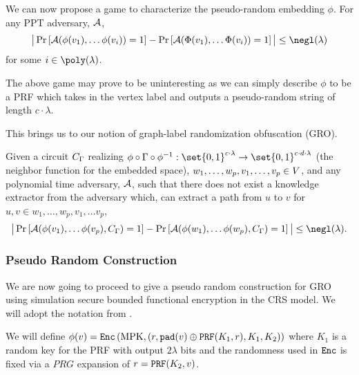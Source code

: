 We can now propose a game to characterize the pseudo-random embedding $\phi$.
For any PPT adversary, $\mathcal{A}$,
\begin{equation}
	\big|
		\Pr\left[\advers(\phi(v_1), \dots \phi(v_{i})) = 1\right]
		 - 
		\Pr\left[\advers(\idealEmbedFn(v_1), \dots \idealEmbedFn(v_{i})) = 1\right]
	\big|
		\leq \negl(\lambda)
\end{equation}
for some $i \in \poly(\lambda)$.

The above game may prove to be uninteresting as we can simply describe $\phi$ to be a PRF 
which takes in the vertex label and outputs a pseudo-random string of length $c \cdot \lambda$.

This brings us to our notion of graph-label randomization obfuscation (GRO).

\begin{definition}
	Given a circuit $C_\Gamma$ realizing $\phi \circ \Gamma \circ \phi^{-1}: \set{0, 1}^{c \cdot \lambda} \rightarrow \set{0, 1}^{c \cdot d \cdot \lambda}$ (the neighbor function for the embedded space),
	$w_1, \dots, w_p, v_1, \dots, v_p \in V$, and any polynomial time adversary, $\mathcal{A}$, such that there does not exist a knowledge extractor from the adversary which,
	can extract a path from $u$ to $v$ for $u, v \in w_1, \dots, w_p, v_1, \dots v_p$,
	\begin{equation}
	\big|
		\Pr\left[\advers(\phi(v_1), \dots \phi(v_{p}), \circNeigb) = 1\right]
		 - 
		\Pr\left[\advers(\embedFn(w_1), \dots \embedFn(w_{p}), \circNeigb) = 1\right]
	\big|
		\leq \negl(\lambda).
	\end{equation}
\end{definition}

\subsubsection*{Pseudo Random Construction}
We are now going to proceed to give a pseudo random construction for GRO using simulation secure bounded functional encryption in the CRS model.
We will adopt the notation from \cite{ananth2019optimal}.

We will define $\phi(v) = \texttt{Enc}\left(\text{MPK}, (r, \texttt{pad}(v) \oplus \texttt{PRF}(K_1, r), K_1, K_2)\right)$ where $K_1$ is a random key for the PRF with output $2 \lambda$ bits
and the randomness used in $\texttt{Enc}$ is fixed via a $PRG$ expansion of $r = \texttt{PRF}(K_2, v)$.


